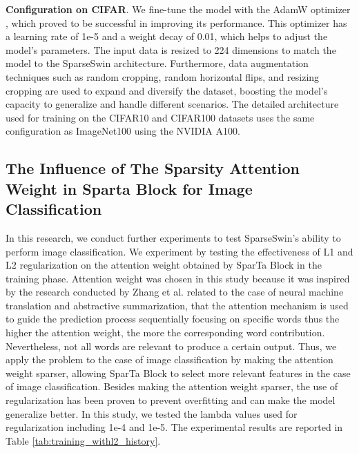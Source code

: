 \documentclass[runningheads]{llncs}
\begin{document}
\textbf{Configuration on CIFAR}. We fine-tune the model with the AdamW optimizer \cite{loshchilov2017decoupled}, which proved to be successful in improving its performance. This optimizer has a learning rate of 1e-5 and a weight decay of 0.01, which helps to adjust the model's parameters. The input data is resized to 224 dimensions to match the model to the SparseSwin architecture. Furthermore, data augmentation techniques such as random cropping, random horizontal flips, and resizing cropping are used to expand and diversify the dataset, boosting the model's capacity to generalize and handle different scenarios. The detailed architecture used for training on the CIFAR10 and CIFAR100 datasets uses the same configuration as ImageNet100 using the NVIDIA A100.

\subsection{The Influence of The Sparsity Attention Weight in Sparta Block for Image Classification}
\label{sec:influence_sparsity}
In this research, we conduct further experiments to test SparseSwin's ability to perform image classification. We experiment by testing the effectiveness of L1 \cite{tibshirani1996regression} and L2 \cite{golub1999tikhonov} regularization on the attention weight obtained by SparTa Block in the training phase. Attention weight was chosen in this study because it was inspired by the research conducted by Zhang et al. \cite{zhang2018attention} related to the case of neural machine translation and abstractive summarization, that the attention mechanism is used to guide the prediction process sequentially focusing on specific words thus the higher the attention weight, the more the corresponding word contribution. Nevertheless, not all words are relevant to produce a certain output. Thus, we apply the problem to the case of image classification by making the attention weight sparser, allowing SparTa Block to select more relevant features in the case of image classification. Besides making the attention weight sparser, the use of regularization has been proven to prevent overfitting and can make the model generalize better. In this study, we tested the lambda values used for regularization including 1e-4 and 1e-5. The experimental results are reported in Table \ref{tab:training_withl2_history}.
\end{document}

